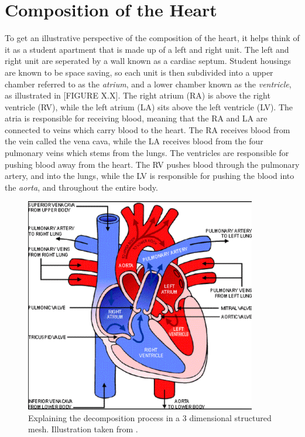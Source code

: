 \section{Composition of the Heart}
To get an illustrative perspective of the composition of the heart, it helps think of it as a student apartment that is made up of a left and right unit. The left and right unit are seperated by a wall known as a cardiac septum. Student housings are known to be space saving, so each unit is then subdivided into a upper chamber referred to as the \textit{atrium}, and a lower chamber known as the \textit{ventricle}, as illustrated in [FIGURE X.X]. The right atrium (RA) is above the right ventricle (RV), while the left atrium (LA) sits above the left ventricle (LV). The atria is responsible for receiving blood, meaning that the RA and LA are connected to veins which carry blood to the heart. The RA receives blood from the vein called the vena cava, while the LA receives blood from the four pulmonary veins which stems from the lungs. The ventricles are responsible for pushing blood away from the heart. The RV pushes blood through the pulmonary artery, and into the lungs, while the LV is responsible for pushing the blood into the \textit{aorta}, and throughout the entire body.

\begin{figure}[h]
 \centering 
     \includegraphics[width=0.9\textwidth]{bilder/b_heart_structure_new}
     \caption{Explaining the decomposition process in a 3 dimensional structured mesh. Illustration taken from \cite{article9}.
     \label{b_heart_structure_new.png}}
\end{figure}

